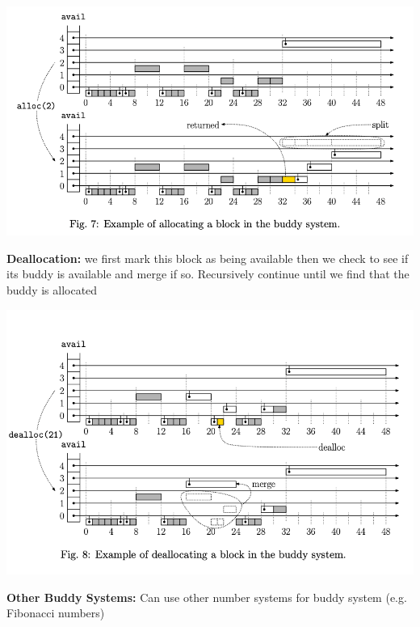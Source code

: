 \documentclass{article}
\begin{document}
  \begin{center}
  \includegraphics[scale=0.4]{BuddySystemInsertion}
  \end{center}
  \textbf{Deallocation: }we first mark this block as being available then we check to see if its buddy is available and merge if so. Recursively continue until we find that the buddy is allocated\\
  \begin{center}
  \includegraphics[scale=0.4]{BuddySystemDeletion}
  \end{center}
  \textbf{Other Buddy Systems: }Can use other number systems for buddy system (e.g. Fibonacci numbers)
\end{document}
